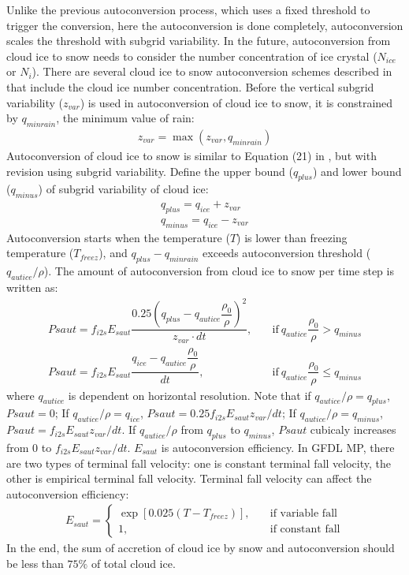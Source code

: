\documentclass[letterpaper,titlepage,10pt]{article}
\numberwithin{equation}{section}
\begin{document}
Unlike the previous autoconversion process, which uses a fixed threshold to trigger the conversion, here the autoconversion is done completely, autoconversion scales the threshold with subgrid variability. In the future, autoconversion from cloud ice to snow needs to consider the number concentration of ice crystal ($N_{ice}$ or $N_i$). There are several cloud ice to snow autoconversion schemes described in \citet{straka2009clou} that include the cloud ice number concentration. Before the vertical subgrid variability ($z_{var}$) is used in autoconversion of cloud ice to snow, it is constrained by $q_{minrain}$, the minimum value of rain:
\begin{gather}
	z_{var} = \max \left(z_{var}, q_{minrain} \right)
\end{gather}
Autoconversion of cloud ice to snow is similar to Equation (21) in \citet{lin1983bulk}, but with revision using subgrid variability. Define the upper bound ($q_{plus}$) and lower bound ($q_{minus}$) of subgrid variability of cloud ice:
\begin{gather}
	q_{plus} = q_{ice} + z_{var} \\
	q_{minus} = q_{ice} - z_{var}
\end{gather}
Autoconversion starts when the temperature ($T$) is lower than freezing temperature ($T_{freez}$), and $q_{plus} - q_{minrain}$ exceeds autoconversion threshold ($q_{autice} / \rho$). The amount of autoconversion from cloud ice to snow per time step is written as:
\begin{align}
    Psaut = f_{i2s} E_{saut} \dfrac{0.25 \left(q_{plus} - q_{autice} \dfrac{\rho_0}{\rho} \right)^2}{z_{var} \cdot dt}, & \quad \text{if} \ q_{autice} \dfrac{\rho_0}{\rho} > q_{minus} \\
    Psaut = f_{i2s} E_{saut} \dfrac{q_{ice} - q_{autice} \dfrac{\rho_0}{\rho}}{dt}, & \quad \text{if} \ q_{autice} \dfrac{\rho_0}{\rho} \leq q_{minus}
\end{align}
where $q_{autice}$ is dependent on horizontal resolution. Note that if $q_{autice} / \rho = q_{plus}$, $Psaut = 0$; If $q_{autice} / \rho = q_{ice}$, $Psaut = 0.25 f_{i2s} E_{saut} z_{var} / dt$; If $q_{autice} / \rho = q_{minus}$, $Psaut = f_{i2s} E_{saut} z_{var} / dt$. If $q_{autice} / \rho$ from $q_{plus}$ to $q_{minus}$, $Psaut$ cubicaly increases from $0$ to $f_{i2s} E_{saut} z_{var} / dt$. $E_{saut}$ is autoconversion efficiency. In GFDL MP, there are two types of terminal fall velocity: one is constant terminal fall velocity, the other is empirical terminal fall velocity. Terminal fall velocity can affect the autoconversion efficiency:
\begin{align}
    E_{saut} =
    \begin{cases}
        \exp \left[0.025 \left(T - T_{freez} \right) \right], & \quad \text{if variable fall} \\
        1, & \quad \text{if constant fall}
    \end{cases}
\end{align}
In the end, the sum of accretion of cloud ice by snow and autoconversion should be less than $75\%$ of total cloud ice.
\end{document}
